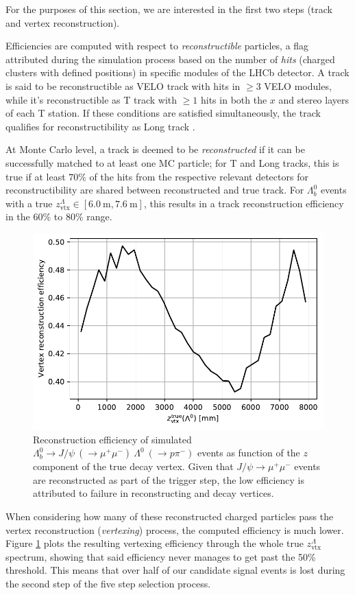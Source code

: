 For the purposes of this section, we are interested in the first two steps (track and vertex reconstruction).

Efficiencies are computed with respect to \textit{reconstructible} particles, a flag attributed during the simulation process based on the number of \textit{hits} (charged clusters with defined positions) in specific modules of the LHCb detector.
A track is said to be reconstructible as VELO track with hits in $\geq 3$ VELO modules, while it's reconstructible as T track with $\geq 1$ hits in both the $x$ and stereo layers of each T station.
If these conditions are satisfied simultaneously, the track qualifies for reconstructibility as Long track \cite{Li:2752971}.

At Monte Carlo level, a track is deemed to be \textit{reconstructed} if it can be successfully matched to at least one MC particle;
for T and Long tracks, this is true if at least $70\%$ of the hits from the respective relevant detectors for reconstructibility are shared between reconstructed and true track. For $\Lambda^0_b$ events with a true $z_\text{vtx}^\Lambda \in [\SI{6.0}{\meter}, \SI{7.6}{\meter}]$, this results in a track reconstruction efficiency in the 60\% to 80\% range.

\begin{figure}[t!]
	\centering
	\includegraphics[width=.6\textwidth]{graphics/03-vertex_reconstruction/lambda_lambdab_reco_efficiency.pdf}
	\caption[A]{Reconstruction efficiency of simulated $\Lambda^0_b \rightarrow J/\psi~(\rightarrow \mu^+\mu^-)~\Lambda^0~(\rightarrow p\pi^-)$ events as function of the $z$ component of the true \lz decay vertex. Given that $J/\psi \rightarrow \mu^+ \mu^-$ events are reconstructed as part of the trigger step, the low efficiency is attributed to failure in reconstructing \lz and \lbz decay vertices.}
	\label{fig:lambda_lambdab_reco_efficiency}
\end{figure}

When considering how many of these reconstructed charged particles pass the vertex reconstruction (\textit{vertexing}) process, the computed efficiency is much lower.
Figure \ref{fig:lambda_lambdab_reco_efficiency} plots the resulting \lbz vertexing efficiency through the whole true $z_\text{vtx}^\Lambda$ spectrum, showing that said efficiency never manages to get past the 50\% threshold.
This means that over half of our candidate signal events is lost during the second step of the five step selection process.

